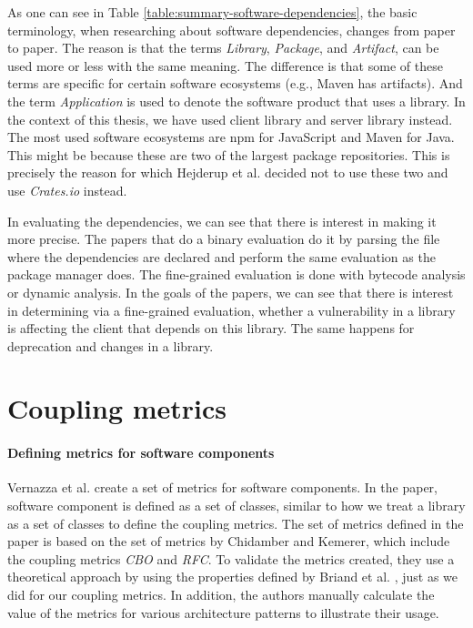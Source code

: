 As one can see in Table \ref{table:summary-software-dependencies}, the basic terminology, when researching about software dependencies, changes from paper to paper. The reason is that the terms \textit{Library}, \textit{Package}, and \textit{Artifact}, can be used more or less with the same meaning. The difference is that some of these terms are specific for certain software ecosystems (e.g., Maven has artifacts). And the term \textit{Application} is used to denote the software product that uses a library. In the context of this thesis, we have used client library and server library instead. The most used software ecosystems are npm for JavaScript and Maven for Java. This might be because these are two of the largest package repositories. This is precisely the reason for which Hejderup et al. \cite{hejderup2018prazi} decided not to use these two and use \textit{Crates.io} instead.

In evaluating the dependencies, we can see that there is interest in making it more precise. The papers that do a binary evaluation do it by parsing the file where the dependencies are declared and perform the same evaluation as the package manager does. The fine-grained evaluation is done with bytecode analysis or dynamic analysis. In the goals of the papers, we can see that there is interest in determining via a fine-grained evaluation, whether a vulnerability in a library is affecting the client that depends on this library. The same happens for deprecation and changes in a library.

\section{Coupling metrics}

\paragraph{Defining metrics for software components \cite{Vernazza2000}}

Vernazza et al. create a set of metrics for software components. In the paper, software component is defined as a set of classes, similar to how we treat a library as a set of classes to define the coupling metrics. The set of metrics defined in the paper is based on the set of metrics by Chidamber and Kemerer, which include the coupling metrics \textit{CBO} and \textit{RFC}. To validate the metrics created, they use a theoretical approach by using the properties defined by Briand et al. \cite{briand1996property}, just as we did for our coupling metrics. In addition, the authors manually calculate the value of the metrics for various architecture patterns to illustrate their usage.

